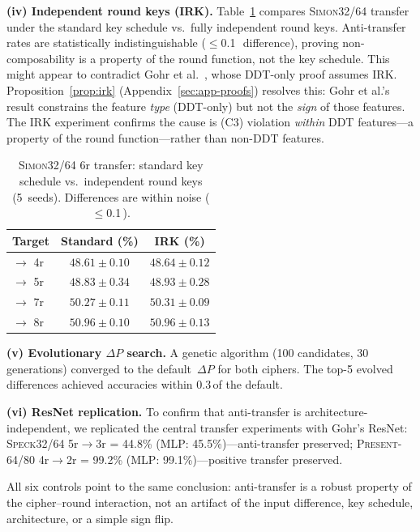 \documentclass[runningheads]{llncs}
\newcommand{\speck}{\textsc{Speck32/64}\xspace}
\newcommand{\simon}{\textsc{Simon32/64}\xspace}
\newcommand{\present}{\textsc{Present-64/80}\xspace}
\newcommand{\pp}{\,\text{pp}}  %
\begin{document}
\textbf{(iv) Independent round keys (IRK).}
Table~\ref{tab:irk} compares \simon transfer under the standard key schedule vs.\ fully independent round keys.
Anti-transfer rates are statistically indistinguishable ($\leq$0.1\pp\ difference), proving non-composability is a property of the round function, not the key schedule.
This might appear to contradict Gohr et al.~\cite{gohr2022assessment}, whose DDT-only proof assumes IRK.
Proposition~\ref{prop:irk} (Appendix~\ref{sec:app-proofs}) resolves this: Gohr et al.'s result constrains the feature \emph{type} (DDT-only) but not the \emph{sign} of those features.
The IRK experiment confirms the cause is (C3) violation \emph{within} DDT features---a property of the round function---rather than non-DDT features.

\begin{table}[t]
\centering
\caption{\simon 6r transfer: standard key schedule vs.\ independent round keys (5~seeds). Differences are within noise ($\leq$0.1\pp).}\label{tab:irk}
\begin{tabular}{@{}lcc@{}}
\toprule
\textbf{Target} & \textbf{Standard (\%)} & \textbf{IRK (\%)} \\
\midrule
$\to$ 4r & $48.61 \pm 0.10$ & $48.64 \pm 0.12$ \\
$\to$ 5r & $48.83 \pm 0.34$ & $48.93 \pm 0.28$ \\
$\to$ 7r & $50.27 \pm 0.11$ & $50.31 \pm 0.09$ \\
$\to$ 8r & $50.96 \pm 0.10$ & $50.96 \pm 0.13$ \\
\bottomrule
\end{tabular}
\end{table}

\textbf{(v) Evolutionary $\Delta P$ search.}
A genetic algorithm (100 candidates, 30 generations) converged to the default~$\Delta P$ for both ciphers.
The top-5 evolved differences achieved accuracies within 0.3\pp of the default.

\textbf{(vi) ResNet replication.}
To confirm that anti-transfer is architecture-independent, we replicated the central transfer experiments with Gohr's ResNet:
\speck 5r$\to$3r = 44.8\% (MLP: 45.5\%)---anti-transfer preserved;
\present 4r$\to$2r = 99.2\% (MLP: 99.1\%)---positive transfer preserved.

All six controls point to the same conclusion: anti-transfer is a robust property of the cipher--round interaction, not an artifact of the input difference, key schedule, architecture, or a simple sign flip.

\end{document}
